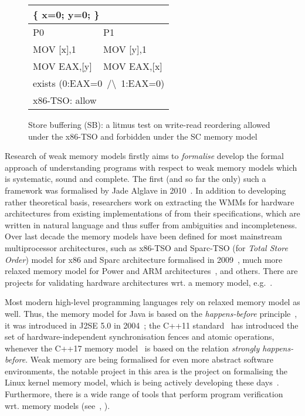 \begin{figure}
\centering
\ttfamily
\begin{tabular}{ |l|l| }
\hline
\multicolumn{2}{|l|}{ \{ x=0; y=0; \}} \tabularnewline \hline
P0 & P1 \\ \hline
MOV [x],1 & MOV [y],1 \\
MOV EAX,[y] & MOV EAX,[x] \\
\hline
\multicolumn{2}{|l|}{exists (0:EAX=0~/\textbackslash~1:EAX=0)} \tabularnewline
\hline
\multicolumn{2}{|l|}{x86-TSO: allow} \tabularnewline
\hline

\end{tabular}
\caption{Store buffering (SB): a litmus test on write-read reordering allowed under the x86-TSO and forbidden under the SC memory model}
\label{simple_wmm_x86}
\end{figure}

Research of weak memory models firstly aims to \textit{formalise} develop the formal approach of understanding programs with respect to weak memory models which is systematic, sound and complete. The first (and so far the only) such a framework was formalised by Jade Alglave in 2010~\cite{alglave2010shared}.
In addition to developing rather theoretical basis, researchers work on extracting the WMMs for hardware architectures from existing implementations of from their specifications, which are written in natural language and thus suffer from ambiguities and incompleteness.
Over last decade the memory models have been defined for most mainstream multiprocessor architectures, such as x86-TSO and Sparc-TSO (for \textit{Total Store Order}) model for x86 and Sparc architecture formalised in 2009~\cite{owens2009better}, much more relaxed memory model for Power and ARM architectures~\cite{alglave2009semantics,sarkar2011understanding, alglave2014herding}, and others.
There are projects for validating hardware architectures wrt. a memory model, e.g.~\cite{lustig2014pipecheck,lustig2016coatcheck}.

Most modern high-level programming languages rely on relaxed memory model as well.
Thus, the memory model for Java is based on the \textit{happens-before} principle~\cite{lamport1978time}, it was introduced in J2SE 5.0 in 2004~\cite{manson2005java}; the C++11 standard~\cite{iso2012iec} has introduced the set of hardware-independent synchronisation fences and atomic operations, whenever the C++17 memory model~\cite{batty2011mathematizing} is based on the relation \textit{strongly happens-before}. Weak memory are being formalised for even more abstract software environments, the notable project in this area is the project on formalising the Linux kernel memory model, which is being actively developing these days~\cite{kernel1}.
Furthermore, there is a wide range of tools that perform program verification wrt. memory models (see~\cite{alglave2013software}, \cite{Porthos17SAS}).

